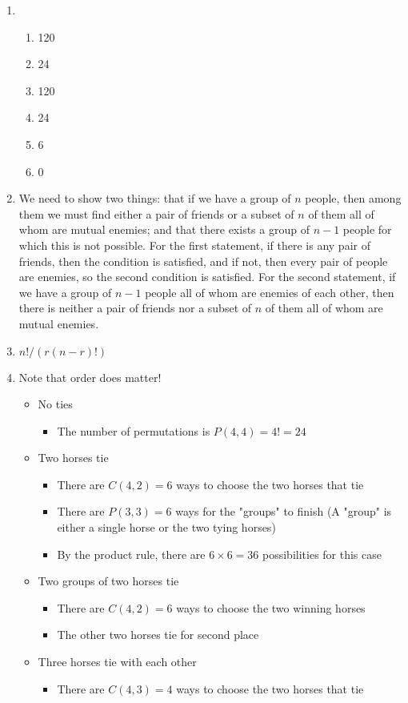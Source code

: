 \documentclass{../../cls/sig-alternate-05-2015}
\begin{document}
\begin{enumerate}

	\item 
	\begin{enumerate}
		\item 120 \item 24 \item 120 \item 24
		\item 6 \item 0
	\end{enumerate}
	\item We need to show two
	things: that if we have a group of $n$ people, then among them
	we must find either a pair of friends or a subset of $n$ of them
	all of whom are mutual enemies; and that there exists a group
	of $n-1$ people for which this is not possible. For the first
	statement, if there is any pair of friends, then the condition is
	satisfied, and if not, then every pair of people are enemies, so
	the second condition is satisfied. For the second statement, if
	we have a group of $n-1$ people all of whom are enemies of
	each other, then there is neither a pair of friends nor a subset
	of $n$ of them all of whom are mutual enemies.
	\item $n!/(r(n - r)!)$
	\item Note that order does matter!
	\begin{itemize}
		\item No ties
			\begin{itemize}
				\item The number of permutations is $P(4,4) = 4! = 24$
			\end{itemize}
		\item Two horses tie
		\begin{itemize}
			\item There are $C(4,2) = 6$ ways to choose the two horses that tie
			\item There are $P(3,3) = 6$ ways for the "groups" to finish (A "group" is either a single horse or the two tying horses)
			\item By the product rule, there are $6\times 6 = 36$ possibilities for this case
		\end{itemize}
		\item Two groups of two horses tie
			\begin{itemize}
				\item There are $C(4,2) = 6$ ways to choose the two winning horses
				
				\item  The other two horses tie for second place
			\end{itemize}		
		\item  Three horses tie with each other
			\begin{itemize}
				\item There are $C(4,3) = 4$ ways to choose the two horses that tie
				

\end{itemize}
\end{itemize}
\end{enumerate}
\end{document}

